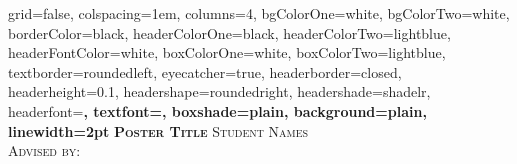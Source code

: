 \documentclass[landscape,final,a0paper,fontscale=0.27]{baposter}
\begin{document}
\begin{poster}%
  {
  grid=false,
  colspacing=1em,
  columns=4,
  bgColorOne=white,
  bgColorTwo=white,
  borderColor=black,
  headerColorOne=black,
  headerColorTwo=lightblue,
  headerFontColor=white,
  boxColorOne=white,
  boxColorTwo=lightblue,
  textborder=roundedleft,
  eyecatcher=true,
  headerborder=closed,
  headerheight=0.1\textheight,
  headershape=roundedright,
  headershade=shadelr,
  headerfont=\Large\bf\textsc, %
  textfont={\setlength{\parindent}{1.5em}},
  boxshade=plain,
  background=plain,
  linewidth=2pt
  }
  {\bf\textsc{Poster Title}\vspace{0.5em}}
  {\textsc{ Student Names\\ Advised by:}}
  {%

\setlength{\fboxsep}{0pt}%
\setlength{\fboxrule}{3pt}%
  }

    \newcommand{\colouredcircle}{%
      \tikz{\useasboundingbox (-0.2em,-0.32em) rectangle(0.2em,0.32em); \draw[draw=black,fill=lightblue,line width=0.03em] (0,0) circle(0.18em);}}




\end{poster}
\end{document}
